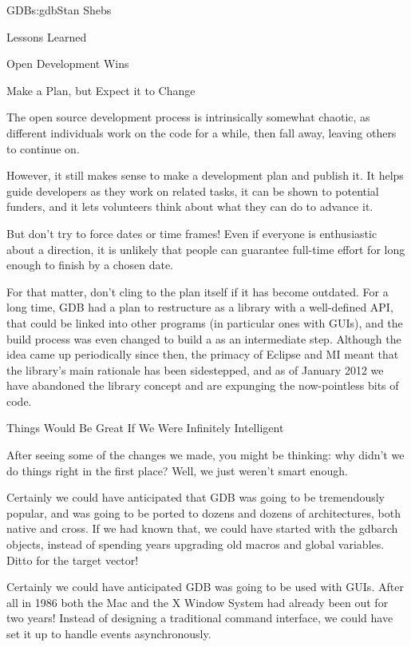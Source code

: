 \begin{aosachapter}{GDB}{s:gdb}{Stan Shebs}
\begin{aosasect1}{Lessons Learned}
\begin{aosasect2}{Open Development Wins}
\end{aosasect2}

\begin{aosasect2}{Make a Plan, but Expect it to Change}

The open source development process is intrinsically somewhat chaotic,
as different individuals work on the code for a while, then fall away,
leaving others to continue on.

However, it still makes sense to make a development plan and publish
it.  It helps guide developers as they work on related tasks, it can
be shown to potential funders, and it lets volunteers think about what they can do
to advance it.

But don't try to force dates or time frames!  Even if everyone is
enthusiastic about a direction, it is unlikely that people can
guarantee full-time effort for long enough to finish by a chosen date.

For that matter, don't cling to the plan itself if it has become
outdated.  For a long time, GDB had a plan to restructure as a library
 with a well-defined API, that could be linked into other
programs (in particular ones with GUIs), and the build process was
even changed to build a  as an intermediate step.
Although the idea came up periodically since then, the primacy of
Eclipse and MI meant that the library's main rationale has been
sidestepped, and as of January 2012 we have abandoned the library
concept and are expunging the now-pointless bits of code.

\end{aosasect2}

\begin{aosasect2}{Things Would Be Great If We Were Infinitely Intelligent}

After seeing some of the changes we made, you might be thinking: why
didn't we do things right in the first place?  Well, we just weren't
smart enough.

Certainly we could have anticipated that GDB was going to be
tremendously popular, and was going to be ported to dozens and dozens
of architectures, both native and cross.  If we had known that, we
could have started with the gdbarch objects, instead of spending years
upgrading old macros and global variables.  Ditto for the target
vector!

Certainly we could have anticipated GDB was going to be used with
GUIs. After all in 1986 both the Mac and the X Window System had
already been out for two years!  Instead of designing a traditional
command interface, we could have set it up to handle events
asynchronously.


\end{aosasect2}
\end{aosasect1}
\end{aosachapter}
